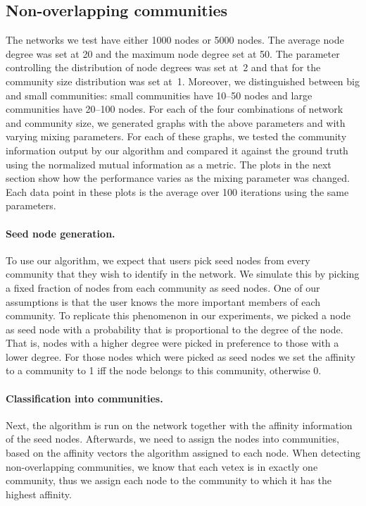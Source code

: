\subsection{Non-overlapping communities}
The networks we test have either 1000 nodes or 5000 nodes. The average node degree
was set at 20 and the maximum node degree set at 50. The parameter controlling the 
distribution of node degrees was set at~2 and that for the community size distribution was 
set at~1. Moreover, we distinguished between big and small communities: small communities have 
10--50 nodes and large communities have 20--100 nodes. 
For each of the four combinations of network and community size, we generated graphs with the 
above parameters and with varying mixing parameters. For each of these graphs, we tested the 
community information output by our algorithm and compared it against the ground truth 
using the normalized mutual information as a metric. The plots in the next section 
show how the performance varies as the mixing parameter was changed. Each data point in 
these plots is the average over 100 iterations using the same parameters. 

\paragraph{Seed node generation.} 
To use our algorithm, we expect that users pick seed nodes from 
every community that they wish to identify in the network. 
We simulate this by picking a fixed fraction of nodes from each community as seed nodes.
One of our assumptions is that the user knows the more important members of each community. 
To replicate this phenomenon in our experiments, we picked a node as seed node
with a probability that is proportional to the degree of the node.
That is, nodes with a higher degree were picked in preference to those with a lower degree.
For those nodes which were picked as seed nodes we set the affinity to a community to 1 iff
the node belongs to this community, otherwise 0.

\paragraph{Classification into communities.}
Next, the algorithm is run on the network together with the affinity information of the seed nodes.
Afterwards, we need to assign the nodes into communities, 
based on the affinity vectors the algorithm assigned to each node.
When detecting non-overlapping communities, we know that each vetex is in exactly one community,
thus we assign each node to the community to which it has the highest affinity.


